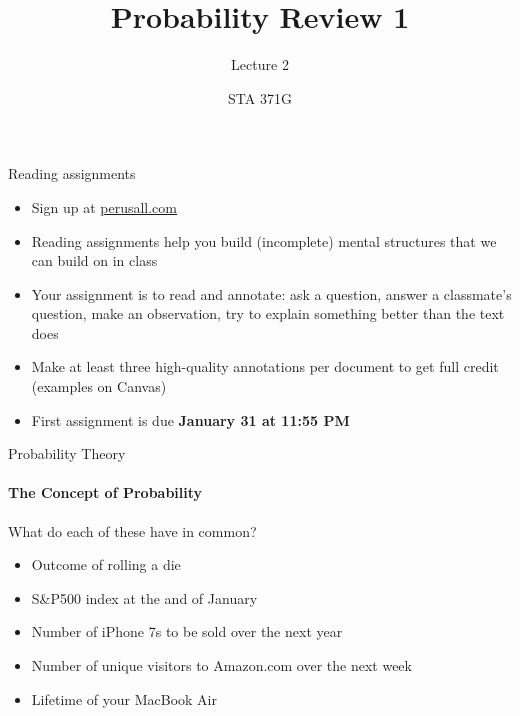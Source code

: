 \documentclass{beamer}\usepackage[]{graphicx}\usepackage[]{color}
\title{Probability Review 1}
\subtitle{Lecture 2}
\author{STA 371G}
\begin{document}
  
  

  \frame{\maketitle}



   \begin{darkframes}
  
    \begin{frame}{Reading assignments}
      \begin{itemize}[<+->]
        \item Sign up at \url{perusall.com}
        \item Reading assignments help you build (incomplete) mental structures that we can build on in class
        \item Your assignment is to read and annotate: ask a question, answer a classmate's question, make an observation, try to explain something better than the text does
        \item Make at least three high-quality annotations per document to get full credit (examples on Canvas)
        \item First assignment is due \textbf{January 31 at 11:55 PM}
      \end{itemize}
    \end{frame}


    \begin{frame}[label=lists]{Probability Theory}
      \framesubtitle{The Concept of Probability}
      
      What do each of these have in common? \pause
      
      \begin{itemize}
      	\item Outcome of rolling a die
      	\item S\&P500 index at the and of January
      	\item Number of iPhone 7s to be sold over the next year
      	\item Number of unique visitors to Amazon.com over the next week
      	\item Lifetime of your MacBook Air
      \end{itemize} \pause
      

\end{frame}
\end{darkframes}
\end{document}
